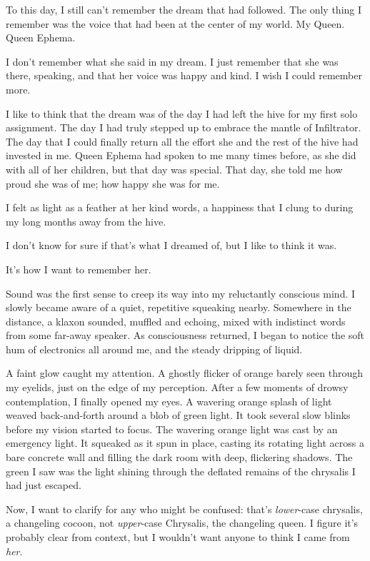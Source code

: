 {\br}%
To this day, I still can’t remember the dream that had followed. The only thing I remember was the voice that had been at the center of my world. My Queen. Queen Ephema.

I don’t remember what she said in my dream. I just remember that she was there, speaking, and that her voice was happy and kind. I wish I could remember more.

I like to think that the dream was of the day I had left the hive for my first solo assignment. The day I had truly stepped up to embrace the mantle of Infiltrator. The day that I could finally return all the effort she and the rest of the hive had invested in me. Queen Ephema had spoken to me many times before, as she did with all of her children, but that day was special. That day, she told me how proud she was of me; how happy she was for me.

I felt as light as a feather at her kind words, a happiness that I clung to during my long months away from the hive.

I don’t know for sure if that’s what I dreamed of, but I like to think it was.

It’s how I want to remember her.

{\br}%
Sound was the first sense to creep its way into my reluctantly conscious mind. I slowly became aware of a quiet, repetitive squeaking nearby. Somewhere in the distance, a klaxon sounded, muffled and echoing, mixed with indistinct words from some far-away speaker. As consciousness returned, I began to notice the soft hum of electronics all around me, and the steady dripping of liquid.

A faint glow caught my attention. A ghostly flicker of orange barely seen through my eyelids, just on the edge of my perception. After a few moments of drowsy contemplation, I finally opened my eyes. A wavering orange splash of light weaved back-and-forth around a blob of green light. It took several slow blinks before my vision started to focus. The wavering orange light was cast by an emergency light. It squeaked as it spun in place, casting its rotating light across a bare concrete wall and filling the dark room with deep, flickering shadows. The green I saw was the light shining through the deflated remains of the chrysalis I had just escaped.

Now, I want to clarify for any who might be confused: that’s \textit{lower}-case chrysalis, a changeling cocoon, not \textit{upper}-case Chrysalis, the changeling queen. I figure it’s probably clear from context, but I wouldn’t want anyone to think I came from \textit{her}.

